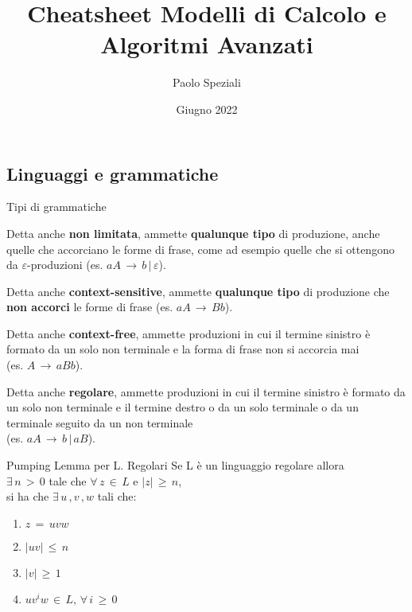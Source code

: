 \documentclass[10pt,a4paper]{article}
\title{Cheatsheet Modelli di Calcolo e Algoritmi Avanzati}
\author{Paolo Speziali}
\date{Giugno 2022}
\begin{document}
\small
\begin{multicols}{3}

\maketitle
\thispagestyle{empty}


\section{Linguaggi e grammatiche}


\begin{textbox}{Tipi di grammatiche}

Detta anche \textbf{non limitata}, ammette \textbf{qualunque tipo}
di produzione, anche quelle che accorciano le forme di
frase, come ad esempio quelle che si ottengono da \(\varepsilon\)-produzioni
(es. \(aA\,\rightarrow\,b\,|\,\varepsilon\)).

Detta anche \textbf{context-sensitive}, ammette \textbf{qualunque tipo}
di produzione che \textbf{non accorci} le forme di frase
(es. \(aA\,\rightarrow\,Bb\)).

Detta anche \textbf{context-free}, ammette produzioni in cui
il termine sinistro è formato da un solo non terminale
e la forma di frase non si accorcia mai \\
(es. \(A\,\rightarrow\,aBb\)).

Detta anche \textbf{regolare}, ammette produzioni in cui
il termine sinistro è formato da un solo non terminale
e il termine destro o da un solo terminale o da un
terminale seguito da un non terminale\\
(es. \(aA\,\rightarrow\,b\,|\,aB\)).

\end{textbox}


\begin{textbox}{Pumping Lemma per L. Regolari}
Se L è un linguaggio regolare allora \\
\(\exists \, n \, > \, 0\) tale che \(\forall \, z \, \in \, L \) e
\(|z| \, \geq \, n\),\\si ha che
\(\exists \, u \, ,v \, ,w\) tali che:
\begin{enumerate}[leftmargin=*]
    \item \(z\, =\, uvw\)
    \item \(|uv|\, \leq\,  n\)
    \item \(|v|\, \geq\,  1\)
    \item \(uv^iw\,\in\,L,\,\forall\,i\,\geq\,0\)
\end{enumerate}


\end{textbox}
\end{multicols}
\end{document}
